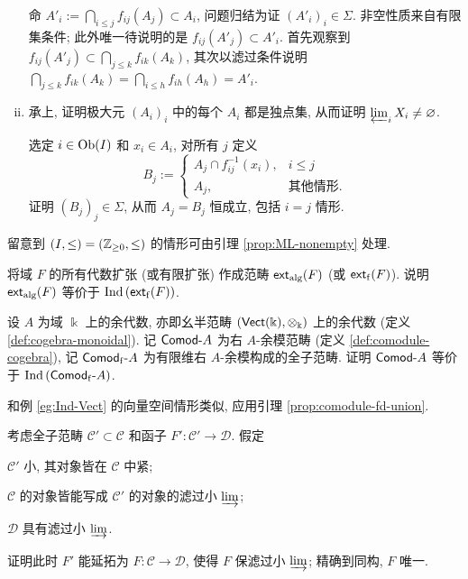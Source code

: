 \begin{Exercises}
\begin{enumerate}[(i)]
		\begin{hint}
			命 $A'_i := \bigcap_{i \leq j} f_{ij}(A_j) \subset A_i$, 问题归结为证 $(A'_i)_i \in \Sigma$. 非空性质来自有限集条件; 此外唯一待说明的是 $f_{ij}(A'_j) \subset A'_i$. 首先观察到 $f_{ij}(A'_j) \subset \bigcap_{j \leq k} f_{ik}(A_k)$, 其次以滤过条件说明 $\bigcap_{j \leq k} f_{ik}(A_k) = \bigcap_{i \leq h} f_{ih}(A_h) = A'_i$.
		\end{hint}
		
		\item 承上, 证明极大元 $(A_i)_i$ 中的每个 $A_i$ 都是独点集, 从而证明 $\varprojlim_i X_i \neq \emptyset$.
		
		\begin{hint}
			选定 $i \in \Obj(I)$ 和 $x_i \in A_i$, 对所有 $j$ 定义
			\[ B_j := \begin{cases}
				A_j \cap f_{ij}^{-1}(x_i), & i \leq j \\
				A_j, & \text{其他情形}.
			\end{cases} \]
			证明 $(B_j)_j \in \Sigma$, 从而 $A_j = B_j$ 恒成立, 包括 $i=j$ 情形.
		\end{hint}
	\end{enumerate}
	留意到 $(I, \leq) = (\Z_{\geq 0}, \leq)$ 的情形可由引理 \ref{prop:ML-nonempty} 处理.
	
	\item 将域 $F$ 的所有代数扩张 (或有限扩张) 作成范畴 $\cate{ext}_{\mathrm{alg}}(F)$ (或 $\cate{ext}_{\mathrm{f}}(F)$). 说明 $\cate{ext}_{\mathrm{alg}}(F)$ 等价于 $\IndC\left(\cate{ext}_{\mathrm{f}}(F)\right)$.
	
	\item 设 $A$ 为域 $\Bbbk$ 上的余代数, 亦即幺半范畴 $\left( \cate{Vect}(\Bbbk), \otimes_{\Bbbk}\right)$ 上的余代数 (定义 \ref{def:cogebra-monoidal}). 记 $\cated{Comod}A$ 为右 $A$-余模范畴 (定义 \ref{def:comodule-cogebra}), 记 $\catesubd{Comod}{\mathrm{f}}A$ 为有限维右 $A$-余模构成的全子范畴. 证明 $\cated{Comod}A$ 等价于 $\IndC \left(\catesubd{Comod}{\mathrm{f}}A\right)$.
	
	\begin{hint}
		和例 \ref{eg:Ind-Vect} 的向量空间情形类似, 应用引理 \ref{prop:comodule-fd-union}.
	\end{hint}
	
		\item 考虑全子范畴 $\mathcal{C}' \subset \mathcal{C}$ 和函子 $F': \mathcal{C}' \to \mathcal{D}$. 假定
	\begin{compactitem}
		\item $\mathcal{C}'$ 小, 其对象皆在 $\mathcal{C}$ 中紧;
		\item $\mathcal{C}$ 的对象皆能写成 $\mathcal{C}'$ 的对象的滤过小 $\varinjlim$;
		\item $\mathcal{D}$ 具有滤过小 $\varinjlim$.
	\end{compactitem}
	证明此时 $F'$ 能延拓为 $F: \mathcal{C} \to \mathcal{D}$, 使得 $F$ 保滤过小 $\varinjlim$; 精确到同构, $F$ 唯一.
	

\end{Exercises}
